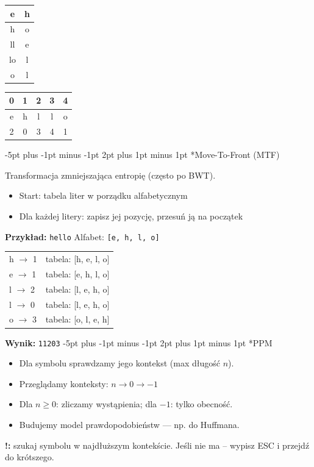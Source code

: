 \documentclass{notatki}
\makeatletter
\renewcommand\section{\@startsection {section}{1}{\z@}%
  {-5pt plus -1pt minus -1pt}%
  {2pt plus 1pt minus 1pt}%
  {\normalfont\large\bfseries}} %
\makeatother
\begin{document}
\begin{multicols}{2}
  \begin{center}
  \begin{tabular}{|c|c|}
    \hline
    e & h \\
    \hline
    \rowcolor{gray!25}
    h & o \\
    \hline
    ll & e \\
    \hline
    lo & l \\
    \hline
    o & l \\
    \hline
  \end{tabular}
  \quad
  \begin{tabular}{|c|c|c|c|c|}
    \hline
    \rowcolor{gray!25}
    0 & 1 & 2 & 3 & 4 \\
    \hline
    e & h & l & l & o \\
    \hline
    2 & 0 & 3 & 4 & 1 \\
    \hline
  \end{tabular}
  \end{center}

  \section*{Move-To-Front (MTF)}

  Transformacja zmniejszająca entropię (często po BWT).
  
  \begin{itemize}
    \item Start: tabela liter w porządku alfabetycznym
    \item Dla każdej litery: zapisz jej pozycję, przesuń ją na początek
  \end{itemize}
  
  \textbf{Przykład:} \texttt{hello}  
  Alfabet: \texttt{[e, h, l, o]}  
  \begin{tabular}{ll}
  h $\rightarrow$ 1 & tabela: [h, e, l, o] \\
  e $\rightarrow$ 1 & tabela: [e, h, l, o] \\
  l $\rightarrow$ 2 & tabela: [l, e, h, o] \\
  l $\rightarrow$ 0 & tabela: [l, e, h, o] \\
  o $\rightarrow$ 3 & tabela: [o, l, e, h]
  \end{tabular}
  
  \textbf{Wynik:} \texttt{11203}
  \section*{PPM}

  \begin{itemize}
    \item Dla symbolu sprawdzamy jego kontekst (max długość $n$).
    \item Przeglądamy konteksty: $n \to 0 \to -1$
    \item Dla $n \geq 0$: zliczamy wystąpienia; dla $-1$: tylko obecność.
    \item Budujemy model prawdopodobieństw — np. do Huffmana.
  \end{itemize}
  \textbf{!:} szukaj symbolu w najdłuższym kontekście. Jeśli nie ma – wypisz ESC i przejdź do krótszego.
  \vspace{-1.5em}
  

\end{multicols}
\end{document}
